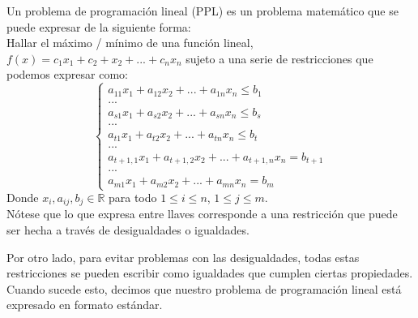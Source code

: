 \documentclass[11pt,fleqn]{book} %
\begin{document}
\begin{definition}
  Un problema de programación lineal (PPL) es un problema matemático que se puede expresar de la siguiente forma: \\
  Hallar el máximo / mínimo de una función lineal, $f(x)=c_1x_1+c_2+x_2+...+c_nx_n$ sujeto a una serie de restricciones que podemos expresar como:
  \begin{equation*}
	\left\lbrace
	\begin{array}{l}
	  a_{11}x_1+a_{12}x_2+...+a_{1n}x_n \leq b_1 \\
	  ... \\
	  a_{s1}x_1+a_{s2}x_2+...+a_{sn}x_n \leq b_s \\
	  ... \\
	  a_{t1}x_1+a_{t2}x_2+...+a_{tn}x_n \leq b_t \\
	  ... \\
	  a_{t+1,1}x_1+a_{t+1,2}x_2+...+a_{t+1,n}x_n = b_{t+1} \\
	  ... \\
	  a_{m1}x_1+a_{m2}x_2+...+a_{mn}x_n = b_{m}
	\end{array}
	\right.
  \end{equation*}
  Donde $x_i, a_{ij}, b_j \in \mathbb{R}$ para todo $1\leq i \leq n$, $1 \leq j \leq m$. \\
  Nótese que lo que expresa entre llaves corresponde a una restricción que puede ser hecha a través de desigualdades o igualdades.
\end{definition}
Por otro lado, para evitar problemas con las desigualdades, todas estas restricciones se pueden escribir como igualdades que cumplen ciertas propiedades. \\
Cuando sucede esto, decimos que nuestro problema de programación lineal está expresado en formato estándar.
\end{document}
